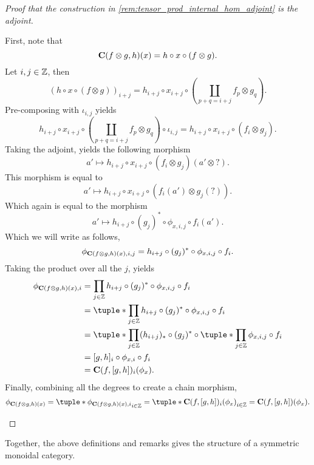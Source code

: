 \begin{proof}[Proof that the construction in \autoref{rem:tensor_prod_internal_hom_adjoint} is the adjoint]
\begin{enumerate}
{            First, note that
            \[
                \operatorname{\mathbf{C}}(f \otimes g, h)(x) = h \circ x \circ (f \otimes g).
            \]
            Let \( i, j \in {\mathbb{Z}} \), then
            \[
                (h \circ x \circ (f \otimes g))_{i + j} = h_{i + j} \circ x_{i + j} \circ (\coprod_{p + q = i + j} f_p \otimes g_q).
            \]
            Pre-composing with \( \iota_{i, j} \) yields
            \[
                h_{i + j} \circ x_{i + j} \circ (\coprod_{p + q = i + j} f_p \otimes g_q) \circ \iota_{i, j} = h_{i + j} \circ x_{i + j} \circ (f_i \otimes g_j).
            \]
            Taking the adjoint, yields the following morphism
            \[
                a' \mapsto h_{i + j} \circ x_{i + j} \circ (f_i \otimes g_j)(a' \otimes ?).
            \]
            This morphism is equal to
            \[
                a' \mapsto h_{i + j} \circ x_{i + j} \circ (f_i (a') \otimes g_j(?)).
            \]
            Which again is equal to the morphism
            \[
                a' \mapsto h_{i + j} \circ (g_j)^* \circ \phi_{x, i, j} \circ f_i(a').
            \]
            Which we will write as follows,
            \[
                \phi_{\operatorname{\mathbf{C}}(f \otimes g, h)(x), i, j} = h_{i + j} \circ (g_j)^* \circ \phi_{x, i, j} \circ f_i.
            \]
            Taking the product over all the \( j \), yields
            \begin{align*}
                \phi_{\C(f \otimes g, h) (x), i} &= \prod_{j \in \Zb} h_{i + j} \circ (g_j)^* \circ \phi_{x, i, j} \circ f_i \\
                &= \tuple*{\prod_{j \in \Zb} h_{i + j} \circ (g_j)^* \circ \phi_{x, i, j}} \circ f_i \\
                &= \tuple*{\prod_{j \in \Zb} (h_{i + j})_* \circ (g_j)^*} \circ \tuple*{\prod_{j \in \Zb} \phi_{x, i, j}} \circ f_i \\
                &= [g, h]_i \circ \phi_{x, i} \circ f_i \\
                &= \C(f, [g, h])_i (\phi_x).
            \end{align*}
            Finally, combining all the degrees to create a chain morphism,
            \[
                \phi_{\C(f \otimes g, h) (x)} = \tuple*{\phi_{\C(f \otimes g, h) (x), i}}_{i \in \Zb} = \tuple*{\C(f, [g, h])_i (\phi_x)}_{i \in \Zb} = \C(f, [g, h]) (\phi_x). \qedhere
            \]
        }
    \end{enumerate}
\end{proof}

Together, the above definitions and remarks gives the structure of a symmetric monoidal category.

